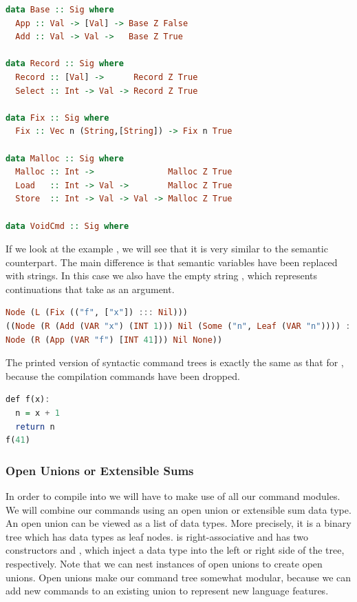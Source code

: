 \begin{lstlisting}[language=Haskell]
data Base :: Sig where
  App :: Val -> [Val] -> Base Z False
  Add :: Val -> Val ->   Base Z True 

data Record :: Sig where
  Record :: [Val] ->      Record Z True
  Select :: Int -> Val -> Record Z True

data Fix :: Sig where
  Fix :: Vec n (String,[String]) -> Fix n True

data Malloc :: Sig where
  Malloc :: Int ->               Malloc Z True
  Load   :: Int -> Val ->        Malloc Z True
  Store  :: Int -> Val -> Val -> Malloc Z True

data VoidCmd :: Sig where
\end{lstlisting}

If we look at the example , we will see that it is very similar to the semantic counterpart. The main difference is that semantic variables have been replaced with strings. In this case we also have the empty string , which represents continuations that take \icode{()} as an argument.

\begin{lstlisting}[language=Haskell]
Node (L (Fix (("f", ["x"]) ::: Nil)))
((Node (R (Add (VAR "x") (INT 1))) Nil (Some ("n", Leaf (VAR "n")))) ::: Nil) (Some ("",
Node (R (App (VAR "f") [INT 41])) Nil None))
\end{lstlisting}

The printed version of syntactic command trees is exactly the same as that for , because the compilation commands have been dropped.

\begin{lstlisting}[language=Haskell]
def f(x):
  n = x + 1
  return n
f(41)
\end{lstlisting}

\subsubsection{\label{subsection:openunion}Open Unions or Extensible Sums}
In order to compile  into  we will have to make use of all our  command modules. We will combine our commands using an open union or extensible sum data type. An open union can be viewed as a list of data types. More precisely, it is a binary tree which has data types as leaf nodes. \icode{:+:} is right-associative and has two constructors  and , which inject a data type into the left or right side of the tree, respectively. Note that we can nest instances of open unions to create open unions. Open unions make our command tree somewhat modular, because we can add new commands to an existing union to represent new language features.

